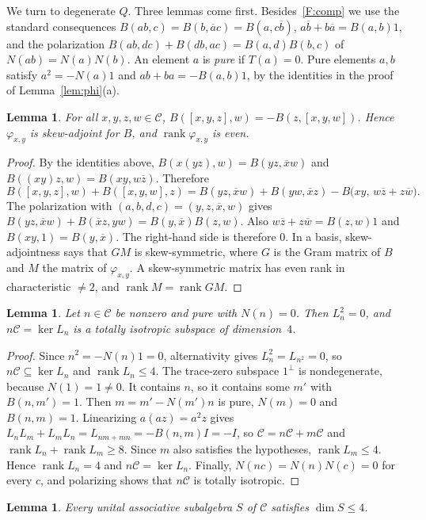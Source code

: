 \documentclass[11pt]{amsart}
\newtheorem{lemma}[theorem]{Lemma}
\theoremstyle{definition}
\theoremstyle{remark}
\newcommand{\C}{\mathcal{C}}
\newcommand{\conj}[1]{\overline{#1}}
\newcommand{\assoc}[3]{[#1,#2,#3]}
\DeclareMathOperator{\rank}{rank}
\begin{document}
We turn to degenerate $Q$. Three lemmas come first. Besides~\ref{F:comp} we
use the standard consequences $B(ab,c)=B(b,\conj ac)=B(a,c\conj b)$,
$a\conj b+b\conj a=B(a,b)1$, and the polarization
$B(ab,dc)+B(db,ac)=B(a,d)B(b,c)$ of $N(ab)=N(a)N(b)$. An element $a$ is
\emph{pure} if $T(a)=0$. Pure elements $a,b$ satisfy $a^2=-N(a)1$ and
$ab+ba=-B(a,b)1$, by the identities in the proof of Lemma~\ref{lem:phi}(a).

\begin{lemma}\label{lem:skew}
For all $x,y,z,w\in\C$, $B(\assoc xyz,w)=-B(z,\assoc xyw)$. Hence
$\varphi_{x,y}$ is skew-adjoint for $B$, and $\rank\varphi_{x,y}$ is even.
\end{lemma}

\begin{proof}
By the identities above, $B(x(yz),w)=B(yz,\conj xw)$ and
$B((xy)z,w)=B(xy,w\conj z)$. Therefore
\[
  B(\assoc xyz,w)+B(\assoc xyw,z)
  =B(yz,\conj xw)+B(yw,\conj xz)-B\bigl(xy,\,w\conj z+z\conj w\bigr).
\]
The polarization with $(a,b,d,c)=(y,z,\conj x,w)$ gives
$B(yz,\conj xw)+B(\conj xz,yw)=B(y,\conj x)B(z,w)$. Also
$w\conj z+z\conj w=B(z,w)1$ and $B(xy,1)=B(y,\conj x)$. The right-hand side is
therefore $0$. In a basis, skew-adjointness says that $GM$ is skew-symmetric,
where $G$ is the Gram matrix of $B$ and $M$ the matrix of $\varphi_{x,y}$. A
skew-symmetric matrix has even rank in characteristic $\neq2$, and
$\rank M=\rank GM$.
\end{proof}

\begin{lemma}\label{lem:iso}
Let $n\in\C$ be nonzero and pure with $N(n)=0$. Then $L_n^2=0$, and
$n\C=\ker L_n$ is a totally isotropic subspace of dimension~$4$.
\end{lemma}

\begin{proof}
Since $n^2=-N(n)1=0$, alternativity gives $L_n^2=L_{n^2}=0$, so
$n\C\subseteq\ker L_n$ and $\rank L_n\le4$. The trace-zero subspace
$1^\perp$ is nondegenerate, because $N(1)=1\neq0$. It contains $n$, so it
contains some $m'$ with $B(n,m')=1$. Then $m=m'-N(m')n$ is pure, $N(m)=0$ and
$B(n,m)=1$. Linearizing $a(az)=a^2z$ gives
$L_nL_m+L_mL_n=L_{nm+mn}=-B(n,m)I=-I$, so $\C=n\C+m\C$ and
$\rank L_n+\rank L_m\ge8$. Since $m$ also satisfies the hypotheses,
$\rank L_m\le4$. Hence $\rank L_n=4$ and $n\C=\ker L_n$. Finally,
$N(nc)=N(n)N(c)=0$ for every $c$, and polarizing shows that $n\C$ is totally
isotropic.
\end{proof}

\begin{lemma}\label{lem:assoc}
Every unital associative subalgebra $S$ of $\C$ satisfies $\dim S\le4$.
\end{lemma}
\end{document}
